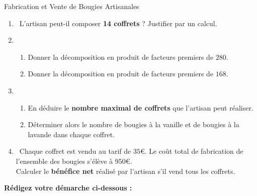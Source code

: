 \begin{sujetdnb}{Fabrication et Vente de Bougies Artisanales}
\begin{enumerate}
    \item \capSApproprier\ L'artisan peut-il composer \textbf{14 coffrets} ? Justifier par un calcul.
    \item \capRealiser\ 
    \begin{enumerate}
        \item Donner la décomposition en produit de facteurs premiers de $280$.
        \item Donner la décomposition en produit de facteurs premiers de $168$.
    \end{enumerate}
    \item \capAnalyser\ 
    \begin{enumerate}
        \item En déduire le \textbf{nombre maximal de coffrets} que l'artisan peut réaliser.
        \item Déterminer alors le nombre de bougies à la vanille et de bougies à la lavande dans chaque coffret.
    \end{enumerate}
    \item \capValider\ Chaque coffret est vendu au tarif de $35\euro$. Le coût total de fabrication de l'ensemble des bougies s'élève à $950\euro$.\\
    Calculer le \textbf{bénéfice net} réalisé par l'artisan s'il vend tous les coffrets.
\end{enumerate}

\vspace{2mm}
\noindent\textbf{Rédigez votre démarche ci-dessous :}
\lignesreponse[10]
\end{sujetdnb}
